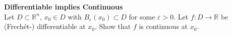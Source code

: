 \textbf{Differentiable implies Continuous}\\
Let $D\subset \mathbb{R}^n$, $x_0\in D$ with $B_\varepsilon(x_0) \subset D$ for some $\varepsilon >0$. Let $f\colon D \to \mathbb{R}$ be (Frechét-) differentiable at $x_0$. Show that $f$ is continuous at $x_0$.